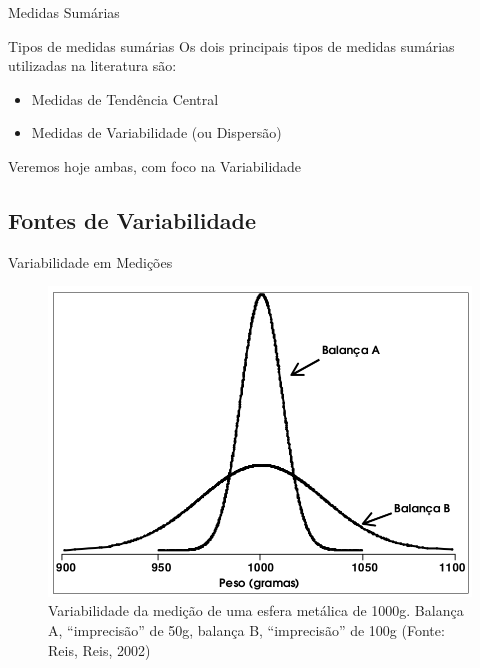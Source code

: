 \documentclass{beamer}
\begin{document}
\begin{frame}{\scriptsize Medidas Sumárias}
  \begin{block}{Tipos de medidas sumárias}
    \footnotesize
    Os dois principais tipos de medidas sumárias utilizadas na literatura são:
    \begin{itemize}
    \footnotesize
    \item Medidas de Tendência Central
    \item Medidas de Variabilidade (ou Dispersão)
    \end{itemize}
    \bigskip
    \hfill \scriptsize Veremos hoje ambas, com foco na Variabilidade
  \end{block}
\end{frame}

\subsection{Fontes de Variabilidade}

\begin{frame}{\scriptsize Variabilidade em Medições}
  \begin{figure}
    \includegraphics[height=0.7\textheight]{Cap3/variancia}
    \caption{\scriptsize Variabilidade da medição de uma esfera metálica de
      1000g. Balança A, ``imprecisão'' de 50g, balança B,
      ``imprecisão'' de 100g (Fonte: Reis, Reis, 2002)}
  \end{figure}
\end{frame}
\end{document}
